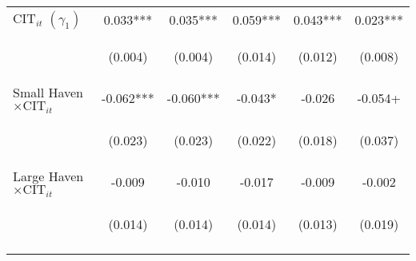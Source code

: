 \begin{center}
\begin{tabular}{lccccc}
$ \text{CIT}_{it}$ $(\gamma_1)$ & 0.033*** & 0.035*** & 0.059*** & 0.043*** & 0.023*** \\
\vspace{4pt} & \begin{footnotesize}(0.004)\end{footnotesize} & \begin{footnotesize}(0.004)\end{footnotesize} & \begin{footnotesize}(0.014)\end{footnotesize} & \begin{footnotesize}(0.012)\end{footnotesize} & \begin{footnotesize}(0.008)\end{footnotesize} \\
Small Haven$\times\text{CIT}_{it}$ & -0.062*** & -0.060*** & -0.043* & -0.026 & -0.054+ \\
\vspace{4pt} & \begin{footnotesize}(0.023)\end{footnotesize} & \begin{footnotesize}(0.023)\end{footnotesize} & \begin{footnotesize}(0.022)\end{footnotesize} & \begin{footnotesize}(0.018)\end{footnotesize} & \begin{footnotesize}(0.037)\end{footnotesize} \\
Large Haven$\times\text{CIT}_{it}$ & -0.009 & -0.010 & -0.017 & -0.009 & -0.002 \\
 & \begin{footnotesize}(0.014)\end{footnotesize} & \begin{footnotesize}(0.014)\end{footnotesize} & \begin{footnotesize}(0.014)\end{footnotesize} & \begin{footnotesize}(0.013)\end{footnotesize} & \begin{footnotesize}(0.019)\end{footnotesize} \\
\vspace{4pt} & \begin{footnotesize}\end{footnotesize} & \begin{footnotesize}\end{footnotesize} & \begin{footnotesize}\end{footnotesize} & \begin{footnotesize}\end{footnotesize} & \begin{footnotesize}\end{footnotesize} \\

\end{tabular}
\end{center}
